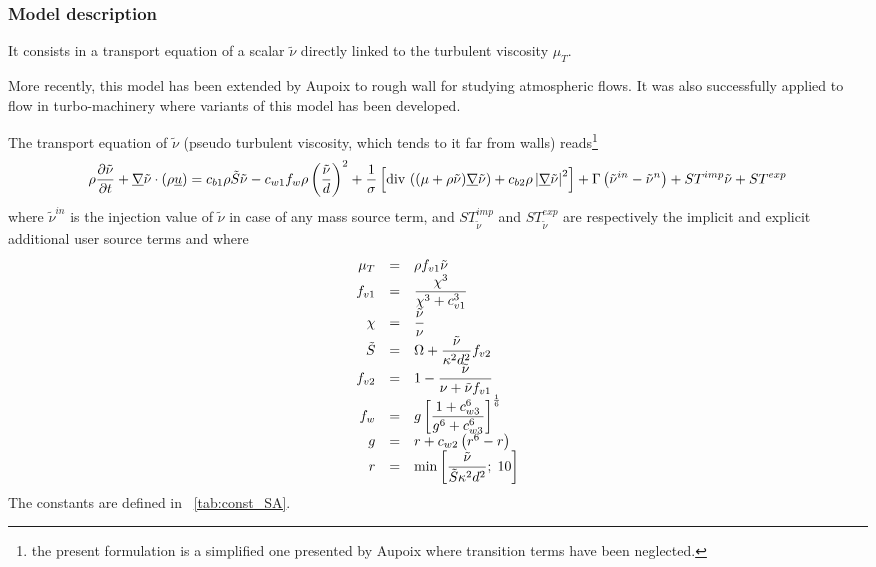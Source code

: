 \subsubsection{Model description}
It consists in a transport equation of a scalar $\tilde{\nu}$ directly linked to the turbulent viscosity $\mu_T$.

More recently, this model has been extended by Aupoix \cite{Aupoix:2003} to rough wall for studying atmospheric flows. It was also successfully applied to flow in turbo-machinery where variants of this model has been developed.

The transport equation of $\tilde{\nu}$ (pseudo turbulent viscosity, which tends to it far from walls) reads\footnote{
the present formulation is a simplified one presented by Aupoix \cite{Aupoix:2003} where transition terms have been neglected.
}
\begin{equation}\label{eq:turbul:SA_used}
\rho \dfrac{\partial \tilde{\nu}}{\partial  t} + \underline{\nabla} \tilde{\nu} \cdot\left( \rho \underline{u} \right)
= c_{b1} \rho  \tilde{S} \tilde{\nu}
- c_{w1}f_{w} \rho \left( \dfrac{\tilde{\nu}}{d} \right)^2
+ \dfrac{1}{ \sigma} \left[ \text{div}\, \left( (\mu + \rho \tilde{\nu}) \underline{\nabla} \tilde{\nu} \right)
+ c_{b2} \rho \left| \underline{\nabla} \tilde{\nu} \right| ^2
  \right]
  + \Gamma \left( \tilde{\nu}^{in} - \tilde{\nu}^n \right) +ST^{imp} \tilde{\nu} +ST^{exp}
\end{equation}
%
where $\tilde{\nu}^{in}$ is the injection value of $\tilde{\nu}$ in case of any mass source term, and $ST^{imp}_{\tilde{\nu}}$ and $ST^{exp}_{\tilde{\nu}}$
are respectively the implicit and explicit additional user source terms and
where
%
\begin{equation}\label{eq:def_fun_SA}
\begin{array}{ r c l}
\mu_T & =& \rho f_{v1} \tilde{\nu} \\
f_{v1} &=& \dfrac{\chi^3 }{\chi^3+ c_{v1}^3} \\
\chi & = & \dfrac{\tilde{\nu}}{ \nu} \\
\tilde{S} &=& \Omega + \dfrac{\tilde{\nu}}{ \kappa ^2 d^2} f_{v2} \\
f_{v2} &=& 1 - \dfrac{ \tilde{\nu}}{\nu + \tilde{\nu} f_{v1}} \\
f_w &=& g \left[ \dfrac{1+ c_{w3}^6 }{g^6+ c_{w3}^6} \right]^\frac{1}{6} \\
g &=& r +c_{w2} \left( r^6 -r \right) \\
r &=& \min \left[ \dfrac{ \tilde{\nu} }{ \tilde{S} \kappa^ 2 d^2 } ; \; 10 \right]
\end{array}
\end{equation}
%
The constants are defined in \tablename~\ref{tab:const_SA}.

